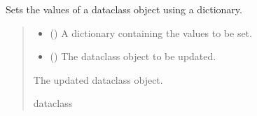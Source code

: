 \documentclass[a4paper,11pt,english,openany]{sphinxmanual}
\begin{document}
\begin{fulllineitems}
\begin{fulllineitems}
\label{\detokenize{api/spyice.postprocess.analysis:spyice.postprocess.analysis.Analysis.set_dataclass}}
\pysigstartsignatures
{}
\pysigstopsignatures
\sphinxAtStartPar
Sets the values of a dataclass object using a dictionary.
\begin{quote}\begin{description}
\begin{itemize}
\item {} 
\sphinxAtStartPar
{} () \textendash{} A dictionary containing the values to be set.

\item {} 
\sphinxAtStartPar
{} () \textendash{} The dataclass object to be updated.

\end{itemize}

\sphinxAtStartPar
The updated dataclass object.

\sphinxAtStartPar
dataclass

\end{description}\end{quote}

\end{fulllineitems}



\end{fulllineitems}
\end{document}

